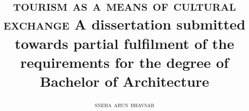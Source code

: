 \documentclass[a5paper]{book}
\title{
  \Large{\textsc{tourism as a means of cultural exchange}}
  \newline
  \newline
  \small{
  A dissertation submitted towards partial fulfilment of the\\
  requirements for the degree of Bachelor of Architecture
  }
}
\author{\textsc{sneha arun bhavsar}}
\date{
  \vfill
  \small{
  \centerline{\texttt{[image: img/puni]}}
  \vspace{1em}
  \textsc{ndmvps} College of Architecture, Nashik\\
  \textsc{University of Pune}\\
  1997--8
  \\
  }
}
\begin{document}
  \maketitle

  \pagebreak

  

  \pagebreak

  \tableofcontents
  \listoffigures
  \listoftables

  \vfill
  
  \pagebreak

    
  
  
  
  
  
  
\end{document}
